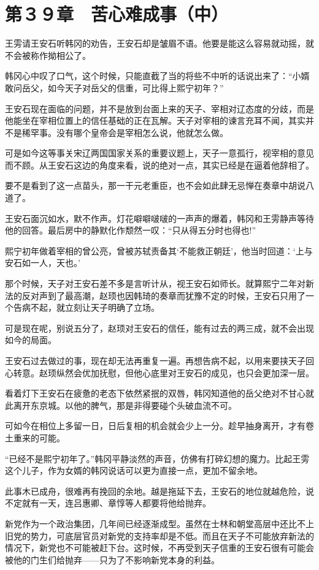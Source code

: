 \section{第３９章　苦心难成事（中）}

王雱请王安石听韩冈的劝告，王安石却是皱眉不语。他要是能这么容易就动摇，就不会被称作拗相公了。

韩冈心中叹了口气，这个时候，只能直截了当的将些不中听的话说出来了：“小婿敢问岳父，如今天子对岳父的信重，可比得上熙宁初年？”

王安石现在面临的问题，并不是放到台面上来的天子、宰相对辽态度的分歧，而是他能坐在宰相位置上的信任基础的正在瓦解。天子对宰相的谏言充耳不闻，其实并不是稀罕事。没有哪个皇帝会是宰相怎么说，他就怎么做。

可是如今这等事关宋辽两国国家关系的重要议题上，天子一意孤行，视宰相的意见而不顾。从王安石这边的角度来看，说的绝对一点，其实已经是在逼着他辞相了。

要不是看到了这一点苗头，那一干元老重臣，也不会如此肆无忌惮在奏章中胡说八道了。

王安石面沉如水，默不作声。灯花噼噼啵啵的一声声的爆着，韩冈和王雱静声等待他的回答。最后房中的静默化作颓然一叹：“只从得五分时也得也!”

熙宁初年做着宰相的曾公亮，曾被苏轼责备其‘不能救正朝廷’，他当时回道：‘上与安石如一人，天也。’

那个时候，天子对王安石差不多是言听计从，视王安石如师长。就算熙宁二年对新法的反对声到了最高潮，赵顼也因韩琦的奏章而犹豫不定的时候，王安石只用了一个告病不起，就立刻让天子明确了立场。

可是现在呢，别说五分了，赵顼对王安石的信任，能有过去的两三成，就不会出现如今的局面。

王安石过去做过的事，现在却无法再重复一遍。再想告病不起，以用来要挟天子回心转意。赵顼纵然会优加抚慰，但他心底里对王安石的成见，也只会更加深一层。

看着灯下王安石在疲惫的老态下依然紧抿的双唇，韩冈知道他的岳父绝对不甘心就此离开东京城。以他的脾气，那是非得要碰个头破血流不可。

可如今在相位上多留一日，日后复相的机会就会少上一分。趁早抽身离开，才有卷土重来的可能。

“已经不是熙宁初年了。”韩冈平静淡然的声音，仿佛有打碎幻想的魔力。比起王雱这个儿子，作为女婿的韩冈说话可以更为直接一点，更加不留余地。

此事木已成舟，很难再有挽回的余地。越是拖延下去，王安石的地位就越危险，说不定就有一天，连吕惠卿、章惇等人都要将他给抛弃。

新党作为一个政治集团，几年间已经逐渐成型。虽然在士林和朝堂高层中还比不上旧党的势力，可底层官员对新党的支持率却是不低。而且在天子不可能放弃新法的情况下，新党也不可能被赶下台。这时候，不再受到天子信重的王安石很有可能会被他的门生们给抛弃——只为了不影响新党本身的利益。

